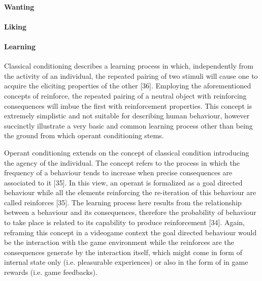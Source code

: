 \paragraph{Wanting}
\label{wanting}
\lorem

\paragraph{Liking}
\label{liking}
\lorem


\paragraph{Learning}
\label{learning}
Classical conditioning describes a learning process in which, independently from the activity of an individual, the repeated pairing of two stimuli will cause one to acquire the eliciting properties of the other [36]. Employing the aforementioned concepts of reinforce, the repeated pairing of a neutral object with reinforcing consequences will imbue the first with reinforcement properties. This concept is extremely simplistic and not suitable for describing human behaviour, however succinctly illustrate a very basic and common learning process other than being the ground from which operant conditioning stems.

Operant conditioning extends on the concept of classical condition introducing the agency of the individual. The concept refers to the process in which the frequency of a behaviour tends to increase when precise consequences are associated to it [35]. In this view, an operant is formalized as a goal directed behaviour while all the elements reinforcing the re-iteration of this behaviour are called reinforces [35]. The learning process here results from the relationship between a behaviour and its consequences, therefore the probability of behaviour to take place is related to its capability to produce reinforcement [34]. Again, reframing this concept in a videogame context the goal directed behaviour would be the interaction with the game environment while the reinforces are the consequences generate by the interaction itself, which might come in form of internal state only (i.e. pleasurable experiences) or also in the form of in game rewards (i.e. game feedbacks).

